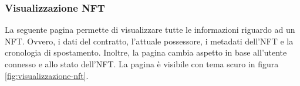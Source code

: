 \subsubsection{Visualizzazione NFT} 

La seguente pagina permette di visualizzare tutte le informazioni riguardo ad un NFT. Ovvero, i dati del contratto, l'attuale possessore, i metadati dell'NFT e la cronologia di spostamento. Inoltre, la pagina cambia aspetto in base all'utente connesso e allo stato dell'NFT. La pagina è visibile con tema scuro in figura \ref{fig:visualizzazione-nft}.

\begin{figure}[H]
    \begin{minipage}{0.7\textwidth}
      \centering
    \end{minipage}
    \hfill
    \begin{minipage}{0.26\textwidth }
      \centering

\end{minipage}
\end{figure}
